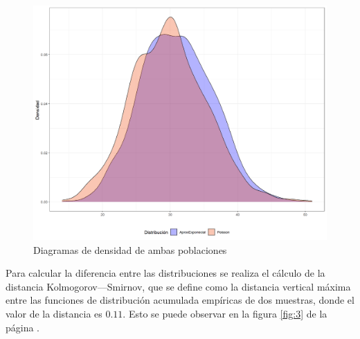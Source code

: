 \documentclass{article}
\begin{document}
\begin{center}
\begin{figure}
\includegraphics[scale=0.6]{figuras/densidadPE.png}
\caption{Diagramas de densidad de ambas poblaciones}
\label{fig:2}
\end{figure}
\end{center}
Para calcular la diferencia entre las distribuciones se realiza el cálculo de la distancia Kolmogorov–--Smirnov, que se define como la distancia vertical máxima entre las funciones de distribución acumulada empíricas de dos muestras, donde el valor de la distancia es $0.11$. Esto se puede observar en la figura \ref{fig:3} de la página \pageref{fig:3}.
\end{document}
